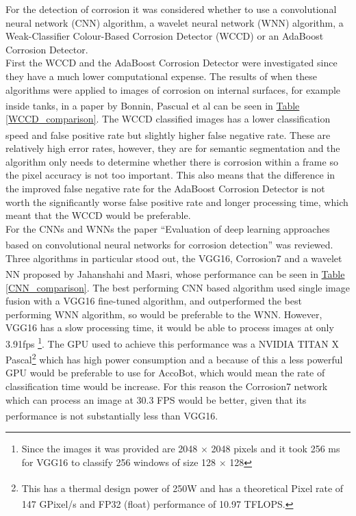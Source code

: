 \documentclass[11pt]{article}		%
\newcommand{\supercite}[1]{\textsuperscript{\cite{#1}}}		%
\newcommand{\tableref}[1]{\hyperref[#1]{Table \ref*{#1}}}     %
\begin{document}
        For the detection of corrosion it was considered whether to use a convolutional neural network (CNN) algorithm, a wavelet neural network (WNN) algorithm, a Weak-Classifier Colour-Based Corrosion Detector (WCCD) or an AdaBoost Corrosion Detector.
        \\
        \hspace*{3ex}First the WCCD and the AdaBoost Corrosion Detector were investigated since they have a much lower computational expense. The results of when these algorithms were applied to images of corrosion on internal surfaces, for example inside tanks, in a paper by Bonnin, Pascual et al\supercite{WCCD} can be seen in \tableref{WCCD_comparison}. The WCCD classified images has a lower classification speed and false positive rate but slightly higher false negative rate.\supercite{WCCD} These are relatively high error rates, however, they are for semantic segmentation and the algorithm only needs to determine whether there is corrosion within a frame so the pixel accuracy is not too important. This also means that the difference in the improved false negative rate for the AdaBoost Corrosion Detector is not worth the significantly worse false positive rate and longer processing time, which meant that the WCCD would be preferable.
        \\
        \hspace*{3ex}For the CNNs and WNNs the paper “Evaluation of deep learning approaches based on convolutional neural networks for corrosion detection”\supercite{Corrosion7}  was reviewed. Three algorithms in particular stood out, the VGG16, Corrosion7 and a wavelet NN proposed by Jahanshahi and Masri\supercite{WNN}, whose performance can be seen in \tableref{CNN_comparison}.  The best performing CNN based algorithm used single image fusion with a VGG16 fine-tuned algorithm, and  outperformed the best performing WNN algorithm, so would be preferable to the WNN. However, VGG16 has a slow processing time, it would be able to process images at only 3.91fps \footnote{Since the images it was provided are 2048 $\times$ 2048 pixels and it took 256 ms for VGG16 to classify 256 windows of size 128 $\times$ 128}. The GPU used to achieve this performance was a NVIDIA TITAN X Pascal\footnote{This has a thermal design power of 250W\supercite{Nvidia_Titan} and has a theoretical Pixel rate of 147 GPixel/s and FP32 (float) performance of 10.97 TFLOPS.\supercite{Corrosion7}} which has high power consumption and a because of this a less powerful GPU would be preferable to use for AccoBot, which would mean the rate of classification time would be increase. For this reason the Corrosion7 network which can process an image at 30.3 FPS would be better, given that its performance is not substantially less than VGG16.\supercite{Corrosion7} 
\end{document}
